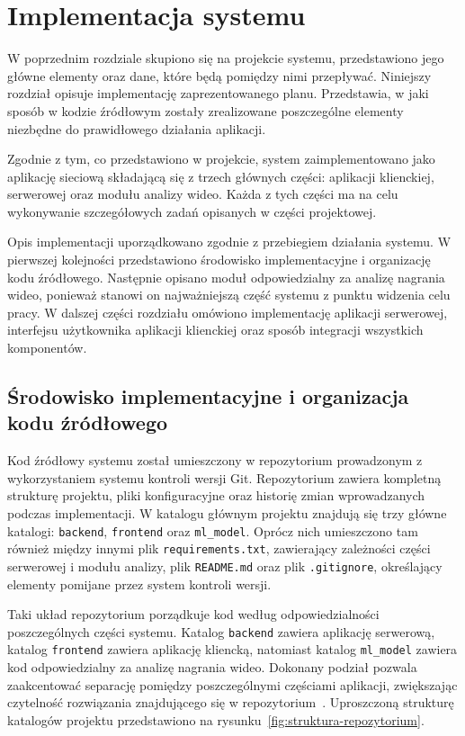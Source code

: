 \section{Implementacja systemu}

W poprzednim rozdziale skupiono się na projekcie systemu, przedstawiono jego główne elementy oraz dane, które będą pomiędzy nimi przepływać. Niniejszy rozdział opisuje implementację zaprezentowanego planu. Przedstawia, w jaki sposób w kodzie źródłowym zostały zrealizowane poszczególne elementy niezbędne do prawidłowego działania aplikacji.

Zgodnie z tym, co przedstawiono w projekcie, system zaimplementowano jako aplikację sieciową składającą się z trzech głównych części: aplikacji klienckiej, serwerowej oraz modułu analizy wideo. Każda z tych części ma na celu wykonywanie szczegółowych zadań opisanych w części projektowej.

Opis implementacji uporządkowano zgodnie z przebiegiem działania systemu. W pierwszej kolejności przedstawiono środowisko implementacyjne i organizację kodu źródłowego. Następnie opisano moduł odpowiedzialny za analizę nagrania wideo, ponieważ stanowi on najważniejszą część systemu z punktu widzenia celu pracy. W dalszej części rozdziału omówiono implementację aplikacji serwerowej, interfejsu użytkownika aplikacji klienckiej oraz sposób integracji wszystkich komponentów.

\subsection{Środowisko implementacyjne i organizacja kodu źródłowego}

Kod źródłowy systemu został umieszczony w repozytorium prowadzonym z wykorzystaniem systemu kontroli wersji Git. Repozytorium zawiera kompletną strukturę projektu, pliki konfiguracyjne oraz historię zmian wprowadzanych podczas implementacji. W katalogu głównym projektu znajdują się trzy główne katalogi: \texttt{backend}, \texttt{frontend} oraz \texttt{ml\_model}. Oprócz nich umieszczono tam również między innymi plik \texttt{requirements.txt}, zawierający zależności części serwerowej i modułu analizy, plik \texttt{README.md} oraz plik \texttt{.gitignore}, określający elementy pomijane przez system kontroli wersji.

Taki układ repozytorium porządkuje kod według odpowiedzialności poszczególnych części systemu. Katalog \texttt{backend} zawiera aplikację serwerową, katalog \texttt{frontend} zawiera aplikację kliencką, natomiast katalog \texttt{ml\_model} zawiera kod odpowiedzialny za analizę nagrania wideo. Dokonany podział pozwala zaakcentować separację pomiędzy poszczególnymi częściami aplikacji, zwiększając czytelność rozwiązania znajdującego się w repozytorium~\cite{microsoft_arch_principles}.
\newpage
Uproszczoną strukturę katalogów projektu przedstawiono na rysunku~\ref{fig:struktura-repozytorium}.

